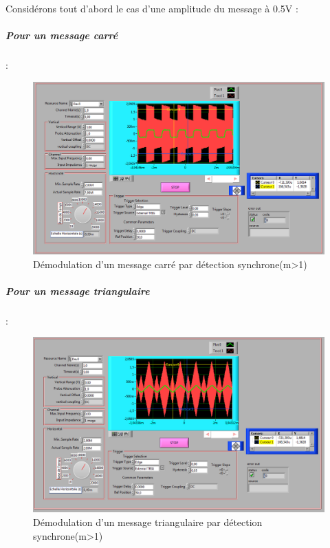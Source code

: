 \documentclass[french]{article}
\begin{document}
Considérons tout d'abord le cas d'une amplitude du message à 0.5V : 
\subparagraph{Pour un message carré} : \\
\begin{figure}[!h]
\includegraphics[width=\textwidth]{carre_synchrone_05.png}
\caption{Démodulation d'un message carré par détection synchrone(m>1)}
\end{figure}
\newpage
\subparagraph{Pour un message triangulaire} : \\
\begin{figure}[!h]
\includegraphics[width=\textwidth]{triangle_synchrone_05.png}
\caption{Démodulation d'un message triangulaire par détection synchrone(m>1)}
\end{figure}
\end{document}
